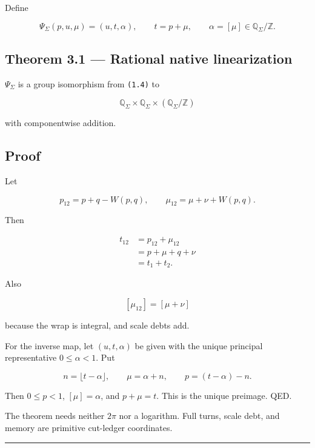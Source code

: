 Define

\[
\boxed{
\Psi_\Sigma(p,u,\mu)
=
(u,t,\alpha),
\qquad
t=p+\mu,
\qquad
\alpha=[\mu]\in\mathbb Q_\Sigma/\mathbb Z.
}
\tag{3.1}
\]

\hypertarget{theorem-3.1-rational-native-linearization}{%
\subsection{Theorem 3.1 --- Rational native linearization}\label{theorem-3.1-rational-native-linearization}}

\(\Psi_\Sigma\) is a group isomorphism from \texttt{(1.4)} to

\[
\boxed{
\mathbb Q_\Sigma
\times
\mathbb Q_\Sigma
\times
(\mathbb Q_\Sigma/\mathbb Z)
}
\tag{3.2}
\]

with componentwise addition.

\hypertarget{proof-1}{%
\subsection{Proof}\label{proof-1}}

Let

\[
p_{12}=p+q-W(p,q),
\qquad
\mu_{12}=\mu+\nu+W(p,q).
\]

Then

\[
\begin{aligned}
t_{12}
&=p_{12}+\mu_{12}\\
&=p+\mu+q+\nu\\
&=t_1+t_2.
\end{aligned}
\tag{3.3}
\]

Also

\[
[\mu_{12}]=[\mu+\nu]
\tag{3.4}
\]

because the wrap is integral, and scale debts add.

For the inverse map, let \((u,t,\alpha)\) be given with the unique principal
representative \(0\le\alpha<1\). Put

\[
n=\lfloor t-\alpha\rfloor,
\qquad
\mu=\alpha+n,
\qquad
p=(t-\alpha)-n.
\tag{3.5}
\]

Then \(0\le p<1\), \([\mu]=\alpha\), and \(p+\mu=t\). This is the unique
preimage. QED.

The theorem needs neither \(2\pi\) nor a logarithm. Full turns, scale debt, and
memory are primitive cut-ledger coordinates.

\begin{center}\rule{0.5\linewidth}{0.5pt}\end{center}

